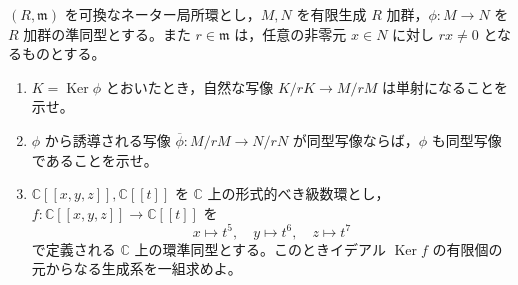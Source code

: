 \documentclass[12pt]{jlreq}
\newcommand{\Ker}{\operatorname{Ker}}
\begin{document}
$(R, \mathfrak{m})$ を可換なネーター局所環とし，$M, N$ を有限生成 $R$ 加群，$\phi: M \to N$ を $R$ 加群の準同型とする。また $r \in \mathfrak{m}$ は，任意の非零元 $x \in N$ に対し $rx \ne 0$ となるものとする。

\begin{enumerate}
  \item $K = \Ker\phi$ とおいたとき，自然な写像 $K/rK \to M/rM$ は単射になることを示せ。
  \item $\phi$ から誘導される写像 $\overline{\phi}: M/rM \to N/rN$ が同型写像ならば，$\phi$ も同型写像であることを示せ。
  \item $\mathbb{C}[[x, y, z]], \mathbb{C}[[t]]$ を $\mathbb{C}$ 上の形式的べき級数環とし，$f: \mathbb{C}[[x, y, z]] \to \mathbb{C}[[t]]$ を
  \[
    x \mapsto t^5,\quad y \mapsto t^6,\quad z \mapsto t^7
  \]
  で定義される $\mathbb{C}$ 上の環準同型とする。このときイデアル $\Ker f$ の有限個の元からなる生成系を一組求めよ。
\end{enumerate}
\end{document}

